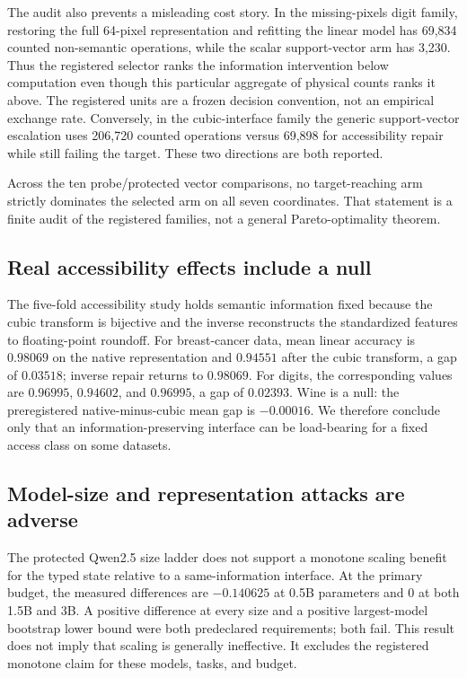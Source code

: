 \documentclass[10pt]{article}
\begin{document}
The audit also prevents a misleading cost story. In the missing-pixels digit family, restoring the full 64-pixel representation and refitting the linear model has 69,834 counted non-semantic operations, while the scalar support-vector arm has 3,230. Thus the registered selector ranks the information intervention below computation even though this particular aggregate of physical counts ranks it above. The registered units are a frozen decision convention, not an empirical exchange rate. Conversely, in the cubic-interface family the generic support-vector escalation uses 206,720 counted operations versus 69,898 for accessibility repair while still failing the target. These two directions are both reported.

Across the ten probe/protected vector comparisons, no target-reaching arm strictly dominates the selected arm on all seven coordinates. That statement is a finite audit of the registered families, not a general Pareto-optimality theorem.

\subsection{Real accessibility effects include a null}

The five-fold accessibility study holds semantic information fixed because the cubic transform is bijective and the inverse reconstructs the standardized features to floating-point roundoff. For breast-cancer data, mean linear accuracy is $0.98069$ on the native representation and $0.94551$ after the cubic transform, a gap of $0.03518$; inverse repair returns to $0.98069$. For digits, the corresponding values are $0.96995$, $0.94602$, and $0.96995$, a gap of $0.02393$. Wine is a null: the preregistered native-minus-cubic mean gap is $-0.00016$. We therefore conclude only that an information-preserving interface can be load-bearing for a fixed access class on some datasets.

\subsection{Model-size and representation attacks are adverse}

The protected Qwen2.5 size ladder does not support a monotone scaling benefit for the typed state relative to a same-information interface. At the primary budget, the measured differences are $-0.140625$ at 0.5B parameters and $0$ at both 1.5B and 3B. A positive difference at every size and a positive largest-model bootstrap lower bound were both predeclared requirements; both fail. This result does not imply that scaling is generally ineffective. It excludes the registered monotone claim for these models, tasks, and budget.
\end{document}
